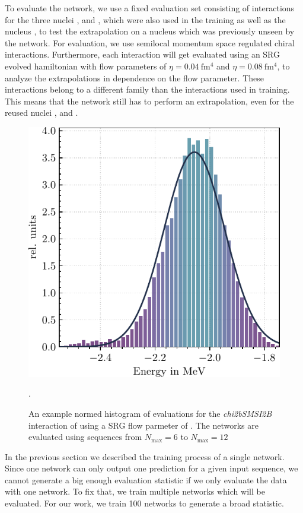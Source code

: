 To evaluate the network, we use a fixed evaluation set consisting of interactions for the three nuclei ,  and , which were also used in the training as well as the nucleus , to test the extrapolation on a nucleus which was previously unseen by the network. For evaluation, we use semilocal momentum space regulated chiral interactions. Furthermore, each interaction will get evaluated using an SRG evolved hamiltonian with flow parameters of $\eta = \SI{0.04}{\femto\metre^4}$ and $\eta = \SI{0.08}{\femto\metre^4}$, to analyze the extrapolations in dependence on the flow parameter. These interactions belong to a different family than the interactions used in training. This means that the network still has to perform an extrapolation, even for the reused nuclei ,  and .

\begin{figure}
  \centering
  \includegraphics[width=.5\textwidth]{media/example_histogram.pdf}
  \caption{An example normed histogram of evaluations for the \textit{chi2bSMSI2B} interaction of  using a SRG flow parmeter of . The networks are evaluated using sequences from $N_\mathrm{max}=6$ to $N_\mathrm{max}=12$}.
  \label{fig:example_histogram}
\end{figure}
In the previous section we described the training process of a single network. Since one network can only output one prediction for a given input sequence, we cannot generate a big enough evaluation statistic if we only evaluate the data with one network. To fix that, we train multiple networks which will be evaluated. For our work, we train 100 networks to generate a broad statistic.


